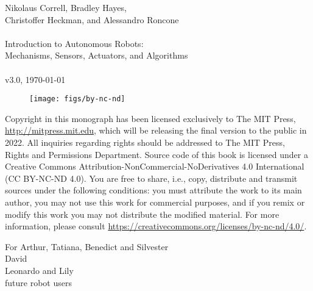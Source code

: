 \documentclass[paper=7in:9in,pagesize=pdftex,11pt,twoside,openright]{scrbook}
\begin{document}


\thispagestyle{empty}
\begin{flushleft}
Nikolaus Correll, Bradley Hayes,\\ Christoffer Heckman, and Alessandro Roncone \\~\\
Introduction to Autonomous Robots:\\ Mechanisms, Sensors, Actuators, and Algorithms\\~\\
v3.0, \today\\
\end{flushleft}

\vfill

\begin{figure}[!h]
\texttt{[image: figs/by-nc-nd]}
\end{figure}

Copyright in this monograph has been licensed exclusively to The MIT Press, \url{http://mitpress.mit.edu}, which will be releasing the final version to the public in 2022. All inquiries regarding rights should be addressed to The MIT Press, Rights and Permissions Department.
Source code of this book is licensed under a Creative Commons Attribution-NonCommercial-NoDerivatives 4.0 International (CC BY-NC-ND 4.0). You are free to share, i.e., copy, distribute and transmit sources under the following conditions: you must attribute the work to its main author, you may not use this work for commercial purposes, and if you remix or modify this work you may not distribute the modified material. For more information, please consult \url{https://creativecommons.org/licenses/by-nc-nd/4.0/}.


\cleardoublepage
\thispagestyle{empty}
\vspace*{\fill}
\begin{center}
For Arthur, Tatiana, Benedict and Silvester\\
David
\\
Leonardo and Lily\\
future robot users\\
\end{center}
\vspace*{\fill}
\end{document}

